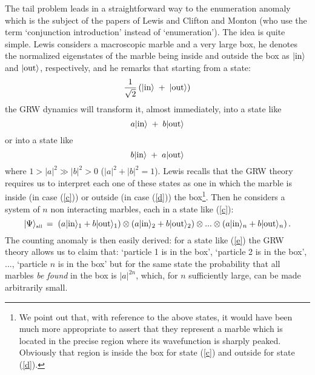 \documentclass[10pt,a4paper]{article}
\begin{document}
The tail problem leads in a straightforward way to the enumeration
anomaly which is the subject of the papers of Lewis \cite{lew} and
Clifton and Monton \cite{cli1,cli2} (who use the term `conjunction
introduction' instead of  `enumeration'). The idea is quite
simple. Lewis considers a macroscopic marble and a very large box,
he denotes the normalized eigenstates of the marble being inside
and outside the box as $|\makebox{in}\rangle$ and
$|\makebox{out}\rangle$, respectively, and he remarks that
starting from a state:
\begin{equation} \label{b}
\frac{1}{\sqrt{2}}\left( |\makebox{in}\rangle\; + \;
|\makebox{out}\rangle \right)
\end{equation}
the GRW dynamics will transform it, almost immediately, into a
state like
\begin{equation} \label{c}
a|\makebox{in}\rangle \; + \; b|\makebox{out}\rangle
\end{equation}
or into a state like
\begin{equation} \label{d}
b|\makebox{in}\rangle \; + \; a|\makebox{out}\rangle
\end{equation}
where $1> |a|^{2} \gg |b|^{2} > 0$ ($|a|^{2} + |b|^{2} = 1$).
Lewis recalls that the GRW theory requires us to interpret each
one of these states as one in which the marble is inside (in case
(\ref{c})) or outside (in case (\ref{d})) the box\footnote{We
point out that, with reference to the above states, it would have
been much more appropriate to assert that they represent a marble
which is located in the precise region where its wavefunction is
sharply peaked. Obviously that region is inside the box for state
(\ref{c}) and outside for state (\ref{d}).}. Then he considers a
system of $n$ non interacting marbles, each in a state like
(\ref{c}):
\begin{equation} \label{e}
|\Psi\rangle_{{\makebox{\tiny all}}} \, = \; \left(
a|\makebox{in}\rangle_{1} + b|\makebox{out}\rangle_{1}\right)
\otimes \left( a|\makebox{in}\rangle_{2} +
b|\makebox{out}\rangle_{2}\right) \otimes ...\otimes \left(
a|\makebox{in}\rangle_{n} + b|\makebox{out}\rangle_{n}\right).
\end{equation}
The counting anomaly is then easily derived: for a state like
(\ref{e}) the GRW theory allows us to claim that: `particle 1 is
in the box', `particle 2 is in the box', ..., `particle $n$ is in
the box' but for the same state the probability that all marbles
{\it be found} in the box is $|a|^{2n}$, which, for $n$
sufficiently large, can be made arbitrarily small.
\end{document}
